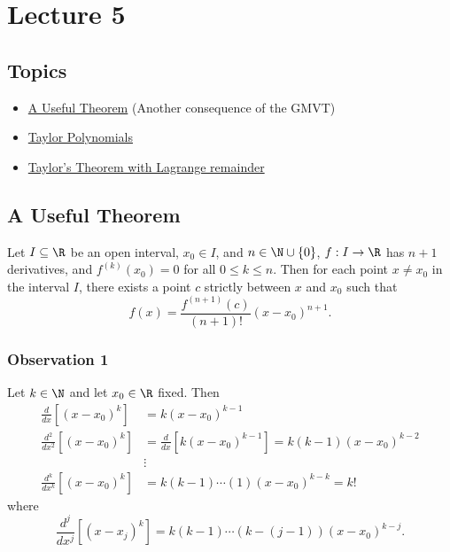 \section{Lecture 5}

\subsection{Topics}

\begin{itemize}
    \item {\hyperref[A Useful Theorem]{A Useful Theorem}} (Another consequence of the GMVT)
    \item {\hyperref[Taylor Polynomials]{Taylor Polynomials}}
    \item {\hyperref[Taylor's Theorem with Lagrange remainder]{Taylor's Theorem with Lagrange remainder}}  
\end{itemize}

\subsection{A Useful Theorem}\label{A Useful Theorem}


\begin{corollary}
    Let \( I \subseteq  \R   \) be an open interval, \( {x}_{0} \in I  \), and \( n \in \N \cup \{ 0 \}  \), \( f: I \to \R  \) has \( n + 1  \) derivatives, and \( f^{(k)}({x}_{0}) = 0  \) for all \( 0 \leq k \leq n  \). Then for each point \( x \neq {x}_{0} \) in the interval \( I  \), there exists a point \( c  \) strictly between \( x  \) and \( {x}_{0} \) such that 
    \[  f(x) = \frac{ f^{(n+1)}(c) }{ (n+1)! } (x-{x}_{0})^{n+1}. \]
\end{corollary}

\subsubsection{Observation 1}

Let \( k \in \N  \) and let \( {x}_{0} \in \R  \) fixed. Then
\begin{align*}
    \frac{ d }{ dx } [(x - {x}_{0})^{k}] &= k (x - {x}_{0})^{k-1} \\
    \frac{ d^{2} }{ d x^{2} } [(x- {x}_{0})^{k}] &= \frac{ d  }{  d x  }  [ k (x - {x}_{0})^{k-1}] = k (k - 1) (x - {x}_{0})^{k - 2} \\
                                                 &\vdots \\
    \frac{ d^{k }  }{  d x^{k } }  [(x - {x}_{0})^{k}] &= k (k -1)\cdots (1) (x - {x}_{0})^{k - k} = k!
\end{align*}
where 
\[  \frac{ d^{j} }{  d x^{j } }  [(x - {x}_{j})^{k}] = k (k - 1) \cdots ( k - (j -1)) (x - {x}_{0})^{k - j}.   \]

